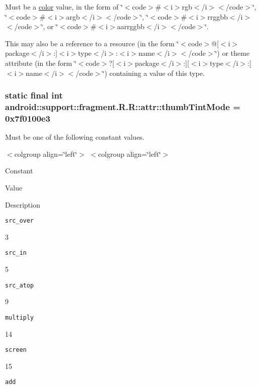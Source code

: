 Must be a \hyperlink{classandroid_1_1support_1_1fragment_1_1_r_1_1color}{color} value, in the form of \char`\"{}$<$code$>$\#$<$i$>$rgb$<$/i$>$$<$/code$>$\char`\"{}, \char`\"{}$<$code$>$\#$<$i$>$argb$<$/i$>$$<$/code$>$\char`\"{}, \char`\"{}$<$code$>$\#$<$i$>$rrggbb$<$/i$>$$<$/code$>$\char`\"{}, or \char`\"{}$<$code$>$\#$<$i$>$aarrggbb$<$/i$>$$<$/code$>$\char`\"{}. 

This may also be a reference to a resource (in the form \char`\"{}$<$code$>$@\mbox{[}$<$i$>$package$<$/i$>$:\mbox{]}$<$i$>$type$<$/i$>$:$<$i$>$name$<$/i$>$$<$/code$>$\char`\"{}) or theme attribute (in the form \char`\"{}$<$code$>$?\mbox{[}$<$i$>$package$<$/i$>$:\mbox{]}\mbox{[}$<$i$>$type$<$/i$>$:\mbox{]}$<$i$>$name$<$/i$>$$<$/code$>$\char`\"{}) containing a value of this type. \hypertarget{classandroid_1_1support_1_1fragment_1_1_r_1_1attr_fa5bfae6ed4b91c925349a2c3876db06}{
\subsubsection[{thumbTintMode}]{\setlength{\rightskip}{0pt plus 5cm}static final int android::support::fragment.R.R::attr::thumbTintMode = 0x7f0100e3}}
\label{classandroid_1_1support_1_1fragment_1_1_r_1_1attr_fa5bfae6ed4b91c925349a2c3876db06}


Must be one of the following constant values. \begin{TabularC}{0}
\hline
\end{TabularC}
$<$colgroup align=\char`\"{}left\char`\"{}$>$ $<$colgroup align=\char`\"{}left\char`\"{}$>$ 

Constant

Value

Description 

{\tt src\_\-over}

3

{\tt src\_\-in}

5

{\tt src\_\-atop}

9

{\tt multiply}

14

{\tt screen}

15

{\tt add}

